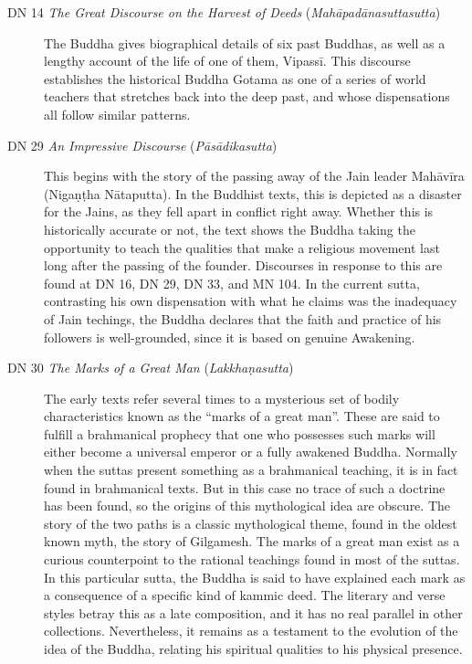 \documentclass[12pt,openany]{book}%
\begin{document}
\begin{description}%
\item[DN 14 \textit{The Great Discourse on the Harvest of Deeds} (\textit{\textsanskrit{Mahāpadānasuttasutta}})] The Buddha gives biographical details of six past Buddhas, as well as a lengthy account of the life of one of them, \textsanskrit{Vipassī}. This discourse establishes the historical Buddha Gotama as one of a series of world teachers that stretches back into the deep past, and whose dispensations all follow similar patterns.%
\item[DN 29 \textit{An Impressive Discourse} (\textit{\textsanskrit{Pāsādikasutta}})] This begins with the story of the passing away of the Jain leader \textsanskrit{Mahāvīra} (\textsanskrit{Nigaṇṭha} \textsanskrit{Nātaputta}). In the Buddhist texts, this is depicted as a disaster for the Jains, as they fell apart in conflict right away. Whether this is historically accurate or not, the text shows the Buddha taking the opportunity to teach the qualities that make a religious movement last long after the passing of the founder. Discourses in response to this are found at DN 16, DN 29, DN 33, and MN 104. In the current sutta, contrasting his own dispensation with what he claims was the inadequacy of Jain techings, the Buddha declares that the faith and practice of his followers is well-grounded, since it is based on genuine Awakening.%
\item[DN 30 \textit{The Marks of a Great Man} (\textit{\textsanskrit{Lakkhaṇasutta}})] The early texts refer several times to a mysterious set of bodily characteristics known as the “marks of a great man”. These are said to fulfill a brahmanical prophecy that one who possesses such marks will either become a universal emperor or a fully awakened Buddha. Normally when the suttas present something as a brahmanical teaching, it is in fact found in brahmanical texts. But in this case no trace of such a doctrine has been found, so the origins of this mythological idea are obscure. The story of the two paths is a classic mythological theme, found in the oldest known myth, the story of Gilgamesh. The marks of a great man exist as a curious counterpoint to the rational teachings found in most of the suttas. In this particular sutta, the Buddha is said to have explained each mark as a consequence of a specific kind of kammic deed. The literary and verse styles betray this as a late composition, and it has no real parallel in other collections. Nevertheless, it remains as a testament to the evolution of the idea of the Buddha, relating his spiritual qualities to his physical presence.%

\end{description}
\end{document}
